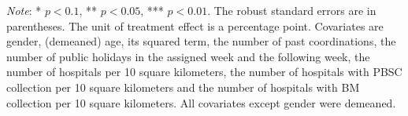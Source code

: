 \documentclass[12pt, a4paper]{article}
\begin{document}
\begin{table}[H]
\begin{threeparttable}
\begin{tablenotes}
\item \emph{Note}: * $p < 0.1$, ** $p < 0.05$, *** $p < 0.01$. The robust standard errors are in parentheses. The unit of treatment effect is a percentage point. Covariates are gender, (demeaned) age, its squared term, the number of past coordinations, the number of public holidays in the assigned week and the following week, the number of hospitals per 10 square kilometers, the number of hospitals with PBSC collection per 10 square kilometers and the number of hospitals with BM collection per 10 square kilometers. All covariates except gender were demeaned.
\end{tablenotes}
\end{threeparttable}
\end{table}

\begin{table}[H]


\end{table}
\end{document}
